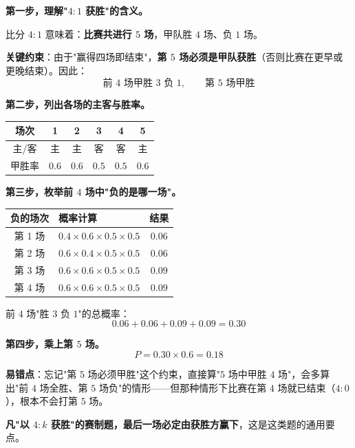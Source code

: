 \textbf{第一步，理解"$4:1$ 获胜"的含义。}

比分 $4:1$ 意味着：\textbf{比赛共进行 $5$ 场}，甲队胜 $4$ 场、负 $1$ 场。

\textbf{关键约束}：由于"赢得四场即结束"，\textbf{第 $5$ 场必须是甲队获胜}（否则比赛在更早或更晚结束）。因此：
\[\text{前 }4\text{ 场甲胜 }3\text{ 负 }1,\qquad \text{第 }5\text{ 场甲胜}\]

\textbf{第二步，列出各场的主客与胜率。}

\begin{center}
\begin{tabular}{cccccc}
\toprule
场次 & 1 & 2 & 3 & 4 & 5 \\
\midrule
主/客 & 主 & 主 & 客 & 客 & 主 \\
甲胜率 & $0.6$ & $0.6$ & $0.5$ & $0.5$ & $0.6$ \\
\bottomrule
\end{tabular}
\end{center}

\textbf{第三步，枚举前 $4$ 场中"负的是哪一场"。}

\begin{center}
\begin{tabular}{clc}
\toprule
负的场次 & 概率计算 & 结果 \\
\midrule
第 1 场 & $0.4\times0.6\times0.5\times0.5$ & $0.06$ \\
第 2 场 & $0.6\times0.4\times0.5\times0.5$ & $0.06$ \\
第 3 场 & $0.6\times0.6\times0.5\times0.5$ & $0.09$ \\
第 4 场 & $0.6\times0.6\times0.5\times0.5$ & $0.09$ \\
\bottomrule
\end{tabular}
\end{center}

前 $4$ 场"胜 $3$ 负 $1$"的总概率：
\[0.06+0.06+0.09+0.09=0.30\]

\textbf{第四步，乘上第 $5$ 场。}
\[P=0.30\times0.6=0.18\]


\begin{gktip}
\textbf{易错点}：忘记"第 $5$ 场必须甲胜"这个约束，直接算"$5$ 场中甲胜 $4$ 场"，会多算出"前 $4$ 场全胜、第 $5$ 场负"的情形——但那种情形下比赛在第 $4$ 场就已结束（$4:0$），根本不会打第 $5$ 场。

\textbf{凡"以 $4:k$ 获胜"的赛制题，最后一场必定由获胜方赢下}，这是这类题的通用要点。
\end{gktip}

